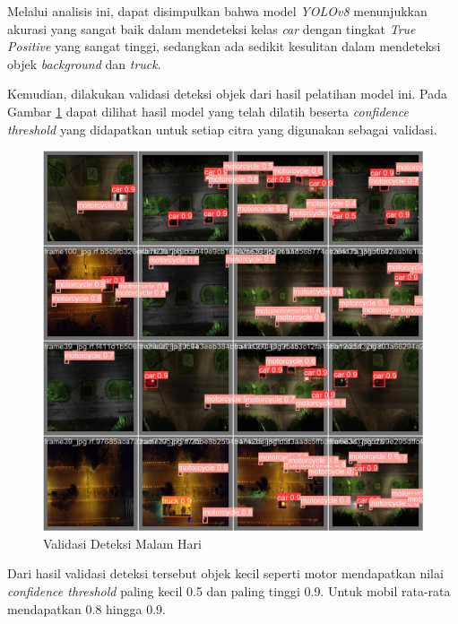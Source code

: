 Melalui analisis ini, dapat disimpulkan bahwa model \textit{YOLOv8} menunjukkan akurasi yang sangat baik dalam mendeteksi kelas \textit{car} dengan tingkat \textit{True Positive} yang sangat tinggi, sedangkan ada sedikit kesulitan dalam mendeteksi objek \textit{background} dan \textit{truck}.

Kemudian, dilakukan validasi deteksi objek dari hasil pelatihan model ini. Pada Gambar \ref{fig:validasi deteksi malam} dapat dilihat hasil model yang telah dilatih beserta \emph{confidence threshold} yang didapatkan untuk setiap citra yang digunakan sebagai validasi.

\begin{figure} [H] \centering
  \includegraphics[scale=0.25]{bab4/val_batch_malam.jpg}
  \caption{Validasi Deteksi Malam Hari}
  \label{fig:validasi deteksi malam}
\end{figure}
\vspace{-10pt}
Dari hasil validasi deteksi tersebut objek kecil seperti motor mendapatkan nilai \emph{confidence threshold} paling kecil 0.5 dan paling tinggi 0.9. Untuk mobil rata-rata mendapatkan 0.8 hingga 0.9.

